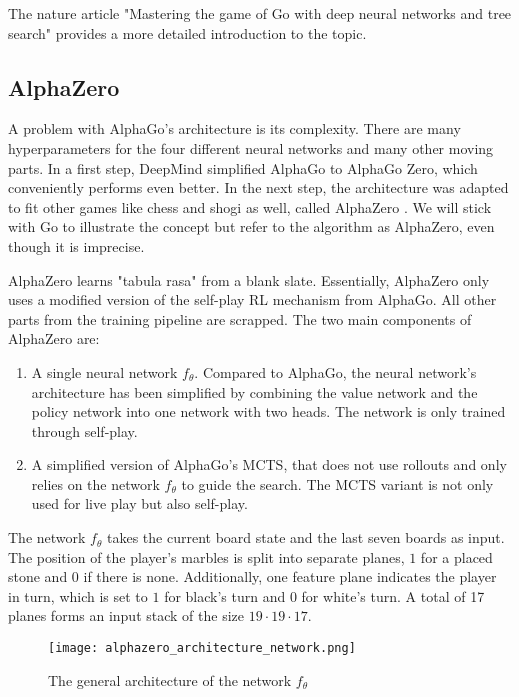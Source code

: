 The nature article "Mastering the game of Go with deep neural networks and tree search" provides a more detailed introduction to the topic. \cite{silver_mastering_2016}

\subsection{AlphaZero}
A problem with AlphaGo's architecture is its complexity. There are many hyperparameters for the four different neural networks and many other moving parts. In a first step, DeepMind simplified AlphaGo to AlphaGo Zero, which conveniently performs even better. In the next step, the architecture was adapted to fit other games like chess and shogi as well, called AlphaZero \cite{silver_mastering_2017-1}. We will stick with Go to illustrate the concept but refer to the algorithm as AlphaZero, even though it is imprecise.

AlphaZero learns "tabula rasa" from a blank slate. Essentially, AlphaZero only uses a modified version of the self-play RL mechanism from AlphaGo. All other parts from the training pipeline are scrapped. The two main components of AlphaZero are:

\begin{enumerate}
    \item A single neural network $f_{\theta}$. Compared to AlphaGo, the neural network's architecture has been simplified by combining the value network and the policy network into one network with two heads. The network is only trained through self-play.
    \item A simplified version of AlphaGo's MCTS, that does not use rollouts and only relies on the network $f_{\theta}$ to guide the search. The MCTS variant is not only used for live play but also self-play.
\end{enumerate}

The network $f_{\theta}$ takes the current board state and the last seven boards as input. The position of the player's marbles is split into separate planes, $1$ for a placed stone and $0$ if there is none. Additionally, one feature plane indicates the player in turn, which is set to $1$ for black's turn and $0$ for white's turn. A total of 17 planes forms an input stack of the size $19 \cdot 19 \cdot 17$.

\begin{figure}
    \centering
    \texttt{[image: alphazero\_architecture\_network.png]}
    \caption{The general architecture of the network $f_{\theta}$ \cite[cf. p. 27ff.]{silver_mastering_2017}}
    \label{alpha_zero_neural_network}
\end{figure}

